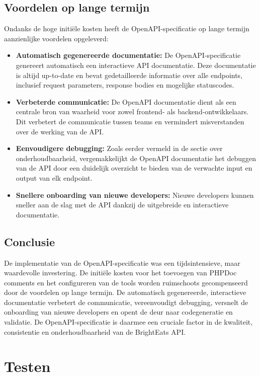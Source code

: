 \subsection{Voordelen op lange termijn}

Ondanks de hoge initiële kosten heeft de OpenAPI-specificatie op lange termijn aanzienlijke voordelen opgeleverd:

\begin{itemize}
  \item \textbf{Automatisch gegenereerde documentatie:} De OpenAPI-specificatie genereert automatisch een interactieve API documentatie. Deze documentatie is altijd up-to-date en bevat gedetailleerde informatie over alle endpoints, inclusief request parameters, response bodies en mogelijke statuscodes.
  \item \textbf{Verbeterde communicatie:} De OpenAPI documentatie dient als een centrale bron van waarheid voor zowel frontend- als backend-ontwikkelaars. Dit verbetert de communicatie tussen teams en vermindert misverstanden over de werking van de API.
  \item \textbf{Eenvoudigere debugging:} Zoals eerder vermeld in de sectie over onderhoudbaarheid, vergemakkelijkt de OpenAPI documentatie het debuggen van de API door een duidelijk overzicht te bieden van de verwachte input en output van elk endpoint.
  \item \textbf{Snellere onboarding van nieuwe developers:} Nieuwe developers kunnen sneller aan de slag met de API dankzij de uitgebreide en interactieve documentatie.
\end{itemize}

\subsection{Conclusie}

De implementatie van de OpenAPI-specificatie was een tijdsintensieve, maar waardevolle investering. De initiële kosten voor het toevoegen van PHPDoc comments en het configureren van de tools worden ruimschoots gecompenseerd door de voordelen op lange termijn. De automatisch gegenereerde, interactieve documentatie verbetert de communicatie, vereenvoudigt debugging, versnelt de onboarding van nieuwe developers en opent de deur naar codegeneratie en validatie. De OpenAPI-specificatie is daarmee een cruciale factor in de kwaliteit, consistentie en onderhoudbaarheid van de Bright\-Eats API.

\section{Testen}


